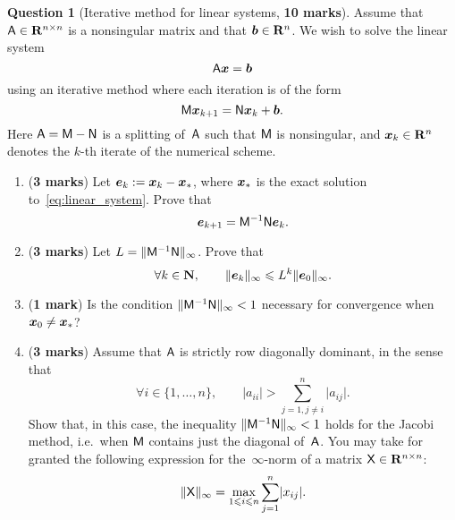 \documentclass[11pt]{article}
\theoremstyle{definition}
\newtheorem{question}{Question}
\theoremstyle{remark}
\begin{document}
\newpage
\begin{question}
    [Iterative method for linear systems, \textbf{10 marks}]
    Assume that $\mathsf A \in \mathbf R^{n \times n}$ is a nonsingular matrix and that $\mathbf{\boldsymbol{b}} \in \mathbf R^n$.
    We wish to solve the linear system
    \begin{equation}
        \label{eq:linear_system}
        \mathsf A \mathbf{\boldsymbol{x}} = \mathbf{\boldsymbol{b}}
    \end{equation}
    using an iterative method where each iteration is of the form
    \begin{equation}
        \label{eq:iterative_scheme}
        \mathsf M \mathbf{\boldsymbol{x}}_{k+1} = \mathsf N \mathbf{\boldsymbol{x}}_k + \mathbf{\boldsymbol{b}}.
    \end{equation}
    Here $\mathsf A = \mathsf M - \mathsf N$ is a splitting of~$\mathsf A$ such that $\mathsf M$ is nonsingular,
    and $\mathbf{\boldsymbol{x}}_k \in \mathbf R^n$ denotes the $k$-th iterate of the numerical scheme.

    \begin{enumerate}
        \item
            (\textbf{3 marks})
            Let $\mathbf{\boldsymbol{e}}_k := \mathbf{\boldsymbol{x}}_k - \mathbf{\boldsymbol{x}}_*$,
            where $\mathbf{\boldsymbol{x}}_*$ is the exact solution to~\eqref{eq:linear_system}.
            Prove that
            \[
                \mathbf{\boldsymbol{e}}_{k+1} = \mathsf M^{-1} \mathsf N \mathbf{\boldsymbol{e}}_k.
            \]

        \item
            (\textbf{3 marks})
            Let $L = \lVert\mathsf M^{-1} \mathsf N\rVert_{\infty}$.
            Prove that
            \begin{equation}
                \label{eq:inequality_interpolation}
                \forall k \in \mathbf N, \qquad
                \lVert\mathbf{\boldsymbol{e}}_k\rVert_{\infty} \leqslant L^k \lVert\mathbf{\boldsymbol{e}}_0\rVert_{\infty}.
            \end{equation}

        \item
            (\textbf{1 mark})
            Is the condition $\lVert\mathsf M^{-1} \mathsf N\rVert_{\infty} < 1$ necessary
            for convergence when $\mathbf{\boldsymbol{x}}_0 \neq \mathbf{\boldsymbol{x}}_*$?

        \item
            (\textbf{3 marks})
            Assume that $\mathsf A$ is strictly row diagonally dominant, in the sense that
            \[
                \forall i \in \{1, \dotsc, n\}, \qquad
                \lvert a_{ii} \rvert > \sum_{j=1, j\neq i}^{n} \lvert a_{ij} \rvert.
            \]
            Show that, in this case, the inequality $\lVert\mathsf M^{-1} \mathsf N\rVert_{\infty} < 1$ holds for the Jacobi method,
            i.e.\ when $\mathsf M$ contains just the diagonal of~$\mathsf A$.
            You may take for granted the following expression for the~$\infty$-norm of a matrix $\mathsf X \in \mathbf R^{n \times n}$:
            \[
                \lVert\mathsf X\rVert_{\infty} = \max_{1 \leqslant i \leqslant n} \sum_{j=1}^{n} \lvert x_{ij}\rvert.
            \]


\end{enumerate}
\end{question}
\end{document}
